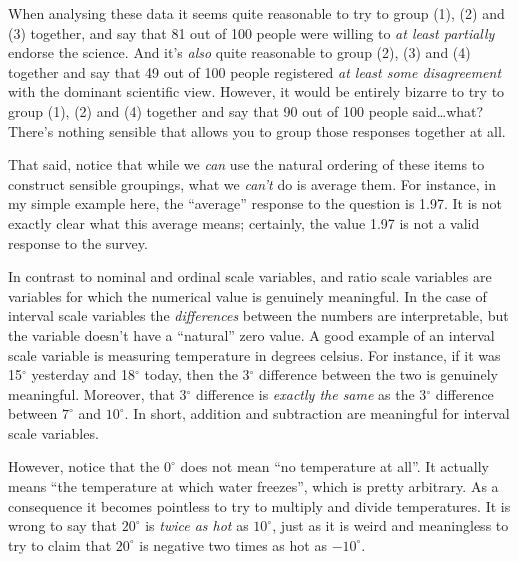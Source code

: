 \noindent
When analysing these data it seems quite reasonable to try to group (1), (2) and (3) together, and say that 81 out of 100 people were willing to {\it at least partially} endorse the science. And it's {\it also} quite reasonable to group (2), (3) and (4) together and say that 49 out of 100 people registered {\it at least some disagreement} with the dominant scientific view. However, it would be entirely bizarre to try to group (1), (2) and (4) together and say that 90 out of 100 people said\ldots what? There's nothing sensible that allows you to group those responses together at all.

That said, notice that while we {\it can} use the natural ordering of these items to construct sensible groupings, what we {\it can't} do is average them. For instance, in my simple example here, the ``average'' response to the question is 1.97. It is not exactly clear what this average means; certainly, the value 1.97 is not a valid response to the survey.


In contrast to nominal and ordinal scale variables,  and ratio scale variables are variables for which the numerical value is genuinely meaningful. In the case of interval scale variables the {\it differences} between the numbers are interpretable, but the variable doesn't have a ``natural'' zero value. A good example of an interval scale variable is measuring temperature in degrees celsius. For instance, if it was 15$^\circ$ yesterday and 18$^\circ$ today, then the 3$^\circ$ difference between the two is genuinely meaningful. Moreover, that 3$^\circ$ difference is {\it exactly the same} as the 3$^\circ$ difference between $7^\circ$ and $10^\circ$. In short, addition and subtraction are meaningful for interval scale variables. 

However, notice that the $0^\circ$ does not mean ``no temperature at all''. It actually means ``the temperature at which water freezes'', which is pretty arbitrary. As a consequence it becomes pointless to try to multiply and divide temperatures. It is wrong to say that $20^\circ$ is {\it twice as hot} as $10^\circ$, just as it is weird and meaningless to try to claim that $20^\circ$ is negative two times as hot as $-10^\circ$. 


